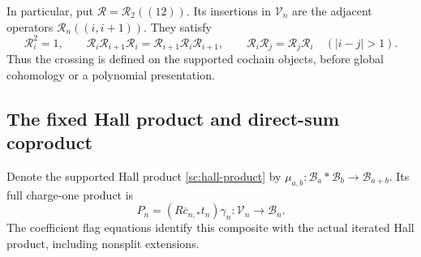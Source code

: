 In particular, put $\mathcal R=\mathcal R_2((12))$.
Its insertions in $\mathcal V_n$ are the adjacent operators
$\mathcal R_n((i,i+1))$. They satisfy
\[
 \mathcal R_i^2=1,\qquad
 \mathcal R_i\mathcal R_{i+1}\mathcal R_i
  =\mathcal R_{i+1}\mathcal R_i\mathcal R_{i+1},\qquad
 \mathcal R_i\mathcal R_j=\mathcal R_j\mathcal R_i
       \quad(|i-j|>1).
\]
Thus the crossing is defined on the supported cochain objects,
before global cohomology or a polynomial presentation.

\subsection{The fixed Hall product and direct-sum coproduct}

Denote the supported Hall product \eqref{sc:hall-product} by
$\mu_{a,b}:\mathcal B_a*\mathcal B_b\to\mathcal B_{a+b}$.
Its full charge-one product is
\[
 P_n=(R\overline c_{n,*}t_n)\gamma_n:
                           \mathcal V_n\longrightarrow\mathcal B_n.
\]
The coefficient flag equations identify this composite with the
actual iterated Hall product, including nonsplit extensions.

